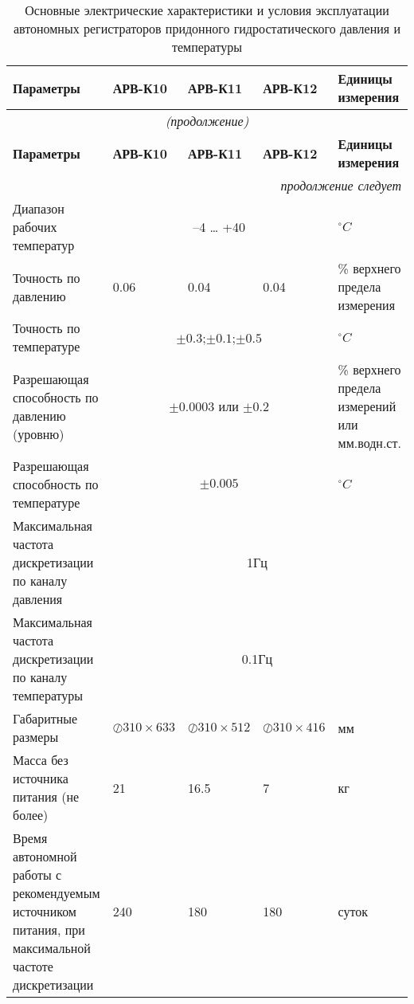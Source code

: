\begin{longtable}{|X |X |X |X| X|}
\caption{Основные электрические характеристики и условия эксплуатации автономных регистраторов придонного гидростатического давления и температуры}\label{tbl:charact}\\
    \hline
        \textbf{Параметры} & \textbf{АРВ-К10} & \textbf{АРВ-К11} & \textbf{АРВ-К12} & \textbf{Единицы измерения} \\
    \hline
        \endfirsthead
    \hline
        \multicolumn{5}{c}{\small\slshape (продолжение)} \\
    \hline
        \textbf{Параметры} & \textbf{АРВ-К10}&\textbf{АРВ-К11}& \textbf{АРВ-К12} & \textbf{Единицы измерения} \\
    \hline
        \endhead
    \hline
        \multicolumn{5}{|r|}{\small\slshape продолжение следует}  \\
    \hline
        \endfoot
    \hline
        \endlastfoot
    \hline
        Диапазон рабочих температур  & \multicolumn{3}{|c|}{–4 … +40}& $^{\circ}C$ \\
  \hline
        Точность по давлению & 0.06 & 0.04 & 0.04 &  \% верхнего предела измерения \\
  \hline
        Точность по температуре & \multicolumn{3}{|c|}{$\pm0.3$;$\pm0.1$;$\pm0.5$} & $^{\circ}C$ \\
  \hline
        Разрешающая способность по давлению (уровню) & \multicolumn{3}{|c|}{$\pm0.0003$ или $\pm0.2$}& \% верхнего предела измерений или мм.водн.ст. \\
  \hline
        Разрешающая способность по температуре & \multicolumn{3}{|c|}{$\pm0.005$}& $^{\circ}C$  \\
  \hline
        Максимальная частота дискретизации по каналу давления & \multicolumn{4}{|c|}{1Гц} \\
  \hline
        Максимальная частота дискретизации по каналу температуры & \multicolumn{4}{|c|}{0.1Гц} \\
  \hline
        Габаритные размеры & $\oslash310\times633$ & $\oslash310\times512$ & $\oslash310\times416$ & мм  \\
  \hline
        Масса без источника питания (не более) & 21 & 16.5 & 7 & кг  \\
  \hline
        Время автономной работы с рекомендуемым источником питания, при максимальной частоте дискретизации & 240 & 180 & 180 & суток  \\
  \hline
  \hline
\end{longtable}
